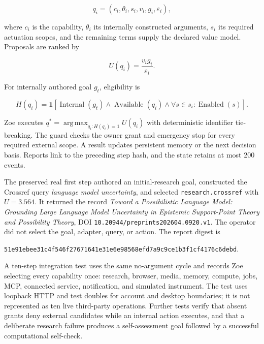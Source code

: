 \documentclass[11pt,a4paper]{article}
\begin{document}
\begin{equation}
q_i=(c_i,\theta_i,s_i,v_i,g_i,\varepsilon_i),
\end{equation}

where $c_i$ is the capability, $\theta_i$ its internally constructed arguments, $s_i$ its required actuation scopes, and the remaining terms supply the declared value model. Proposals are ranked by

\begin{equation}
U(q_i)=\frac{v_ig_i}{\varepsilon_i}.
\end{equation}

For internally authored goal $g_t$, eligibility is

\begin{equation}
H(q_i)=\mathbf 1[\operatorname{Internal}(g_t)
\land \operatorname{Available}(q_i)
\land \forall s\in s_i:\operatorname{Enabled}(s)].
\end{equation}

Zoe executes $q^*=\operatorname{arg\,max}_{q_i:H(q_i)=1}U(q_i)$ with deterministic identifier tie-breaking. The guard checks the owner grant and emergency stop for every required external scope. A result updates persistent memory or the next decision basis. Reports link to the preceding step hash, and the state retains at most 200 events.

The preserved real first step authored an initial-research goal, constructed the Crossref query \emph{language model uncertainty}, and selected \texttt{research.crossref} with $U=3.564$. It returned the record \emph{Toward a Possibilistic Language Model: Grounding Large Language Model Uncertainty in Epistemic Support-Point Theory and Possibility Theory}, DOI \texttt{10.20944/preprints202604.0920.v1}. The operator did not select the goal, adapter, query, or action. The report digest is

\begin{center}
\texttt{51e91ebee31c4f546f27671641e31e6e98568efd7a9c9ce1b3f1cf4176c6debd}.
\end{center}

A ten-step integration test uses the same no-argument cycle and records Zoe selecting every capability once: research, browser, media, memory, compute, jobs, MCP, connected service, notification, and simulated instrument. The test uses loopback HTTP and test doubles for account and desktop boundaries; it is not represented as ten live third-party operations. Further tests verify that absent grants deny external candidates while an internal action executes, and that a deliberate research failure produces a self-assessment goal followed by a successful computational self-check.
\end{document}

